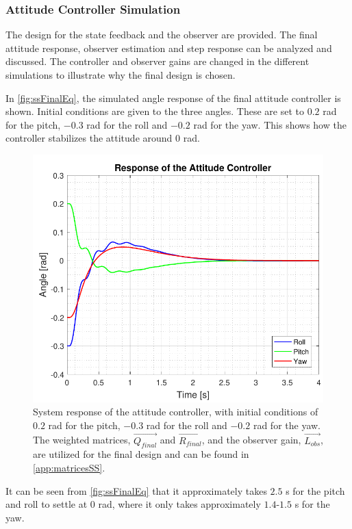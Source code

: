 \subsubsection{Attitude Controller Simulation}\label{sec:AttSim}
The design for the state feedback and the observer are provided. The final attitude response, observer estimation and step response can be analyzed and discussed. The controller and observer gains are changed in the different simulations to illustrate why the final design is chosen.


In \autoref{fig:ssFinalEq}, the simulated angle response of the final attitude controller is shown. Initial conditions are given to the three angles. These are set to $0.2$ rad for the pitch, $-0.3$ rad for the roll and $-0.2$ rad for the yaw. This shows how the controller stabilizes the attitude around 0 rad.
%
\begin{figure}[H]
	\centering
	\includegraphics[scale=0.7]{figures/ssFinalEq.pdf}
	\caption{System response of the attitude controller, with initial conditions of $0.2$ rad for the pitch, $-0.3$ rad for the roll and $-0.2$ rad for the yaw. The weighted matrices, $\vec{Q_{final}}$ and $\vec{R_{final}}$, and the observer gain, $\vec{L_{obs}}$, are utilized for the final design and can be found in \autoref{app:matricesSS}.}
	\label{fig:ssFinalEq}
\end{figure}
%
It can be seen from \autoref{fig:ssFinalEq} that it approximately takes $2.5$ \si{s} for the pitch and roll to settle at 0 rad, where it only takes approximately $1.4$-$1.5$ \si{s} for the yaw.

